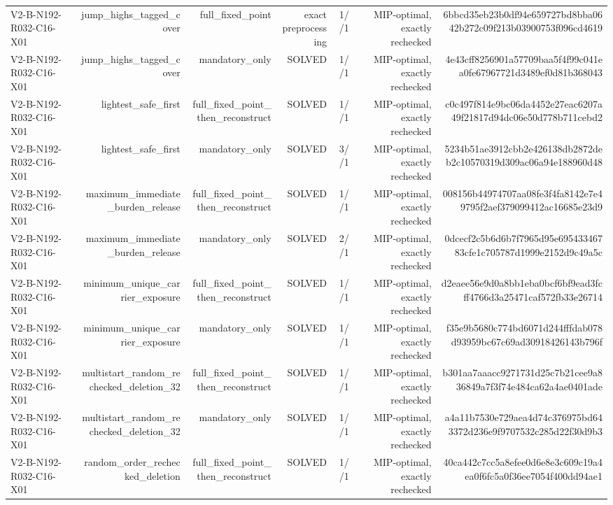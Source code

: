 {\begin{longtable}{lrrrrrr}
V2-B-N192-R032-C16-X01 & jump\_highs\_tagged\_cover & full\_fixed\_point & exact preprocessing & 1//1 & MIP-optimal, exactly rechecked & 6bbcd35eb23b0df94e659727bd8bba0642b272c09f213b03900753f096cd4619 \\
V2-B-N192-R032-C16-X01 & jump\_highs\_tagged\_cover & mandatory\_only & SOLVED & 1//1 & MIP-optimal, exactly rechecked & 4e43cff8256901a57709baa5f4f99c041ea0fe67967721d3489ef0d81b368043 \\
V2-B-N192-R032-C16-X01 & lightest\_safe\_first & full\_fixed\_point\_then\_reconstruct & SOLVED & 1//1 & MIP-optimal, exactly rechecked & c0c497f814e9bc06da4452e27eac6207a49f21817d94dc06e50d778b711cebd2 \\
V2-B-N192-R032-C16-X01 & lightest\_safe\_first & mandatory\_only & SOLVED & 3//1 & MIP-optimal, exactly rechecked & 5234b51ae3912cbb2e426138db2872deb2c10570319d309ac06a94e188960d48 \\
V2-B-N192-R032-C16-X01 & maximum\_immediate\_burden\_release & full\_fixed\_point\_then\_reconstruct & SOLVED & 1//1 & MIP-optimal, exactly rechecked & 008156b44974707aa08fe3f4fa8142e7e49795f2aef379099412ac16685e23d9 \\
V2-B-N192-R032-C16-X01 & maximum\_immediate\_burden\_release & mandatory\_only & SOLVED & 2//1 & MIP-optimal, exactly rechecked & 0dcecf2c5b6d6b7f7965d95e69543346783cfe1c705787d1999e2152d9c49a5c \\
V2-B-N192-R032-C16-X01 & minimum\_unique\_carrier\_exposure & full\_fixed\_point\_then\_reconstruct & SOLVED & 1//1 & MIP-optimal, exactly rechecked & d2eaee56e9d0a8bb1eba0bcf6bf9ead3fcff4766d3a25471caf572fb33e26714 \\
V2-B-N192-R032-C16-X01 & minimum\_unique\_carrier\_exposure & mandatory\_only & SOLVED & 1//1 & MIP-optimal, exactly rechecked & f35e9b5680c774bd6071d244fffdab078d93959bc67c69ad30918426143b796f \\
V2-B-N192-R032-C16-X01 & multistart\_random\_rechecked\_deletion\_32 & full\_fixed\_point\_then\_reconstruct & SOLVED & 1//1 & MIP-optimal, exactly rechecked & b301aa7aaacc9271731d25c7b21cee9a836849a7f3f74e484ca62a4ae0401ade \\
V2-B-N192-R032-C16-X01 & multistart\_random\_rechecked\_deletion\_32 & mandatory\_only & SOLVED & 1//1 & MIP-optimal, exactly rechecked & a4a11b7530e729aea4d74c376975bd643372d236e9f9707532c285d22f30d9b3 \\
V2-B-N192-R032-C16-X01 & random\_order\_rechecked\_deletion & full\_fixed\_point\_then\_reconstruct & SOLVED & 1//1 & MIP-optimal, exactly rechecked & 40ca442c7cc5a8efee0d6e8e3c609c19a4ea0f6fc5a0f36ee7054f400dd94ae1 \\

\end{longtable}}
